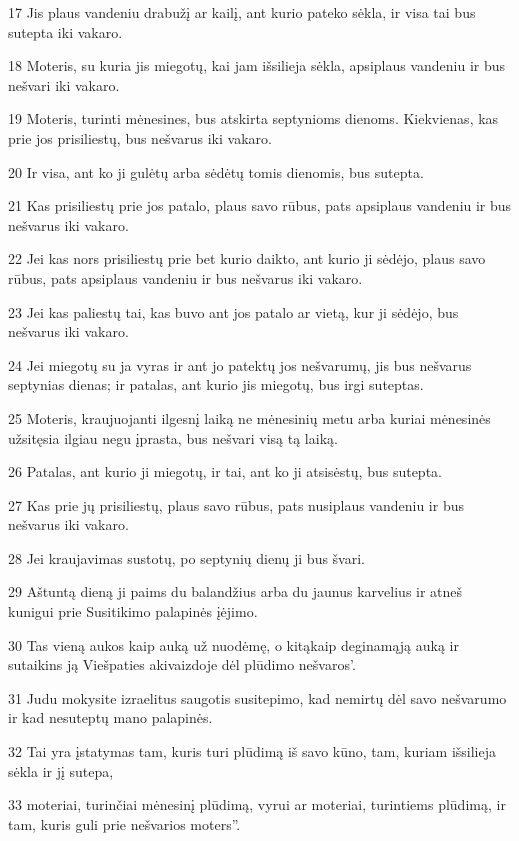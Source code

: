 \par 17 Jis plaus vandeniu drabužį ar kailį, ant kurio pateko sėkla, ir visa tai bus sutepta iki vakaro. 
\par 18 Moteris, su kuria jis miegotų, kai jam išsilieja sėkla, apsiplaus vandeniu ir bus nešvari iki vakaro. 
\par 19 Moteris, turinti mėnesines, bus atskirta septynioms dienoms. Kiekvienas, kas prie jos prisiliestų, bus nešvarus iki vakaro. 
\par 20 Ir visa, ant ko ji gulėtų arba sėdėtų tomis dienomis, bus sutepta. 
\par 21 Kas prisiliestų prie jos patalo, plaus savo rūbus, pats apsiplaus vandeniu ir bus nešvarus iki vakaro. 
\par 22 Jei kas nors prisiliestų prie bet kurio daikto, ant kurio ji sėdėjo, plaus savo rūbus, pats apsiplaus vandeniu ir bus nešvarus iki vakaro. 
\par 23 Jei kas paliestų tai, kas buvo ant jos patalo ar vietą, kur ji sėdėjo, bus nešvarus iki vakaro. 
\par 24 Jei miegotų su ja vyras ir ant jo patektų jos nešvarumų, jis bus nešvarus septynias dienas; ir patalas, ant kurio jis miegotų, bus irgi suteptas. 
\par 25 Moteris, kraujuojanti ilgesnį laiką ne mėnesinių metu arba kuriai mėnesinės užsitęsia ilgiau negu įprasta, bus nešvari visą tą laiką. 
\par 26 Patalas, ant kurio ji miegotų, ir tai, ant ko ji atsisėstų, bus sutepta. 
\par 27 Kas prie jų prisiliestų, plaus savo rūbus, pats nusiplaus vandeniu ir bus nešvarus iki vakaro. 
\par 28 Jei kraujavimas sustotų, po septynių dienų ji bus švari. 
\par 29 Aštuntą dieną ji paims du balandžius arba du jaunus karvelius ir atneš kunigui prie Susitikimo palapinės įėjimo. 
\par 30 Tas vieną aukos kaip auką už nuodėmę, o kitą­kaip deginamąją auką ir sutaikins ją Viešpaties akivaizdoje dėl plūdimo nešvaros’. 
\par 31 Judu mokysite izraelitus saugotis susitepimo, kad nemirtų dėl savo nešvarumo ir kad nesuteptų mano palapinės. 
\par 32 Tai yra įstatymas tam, kuris turi plūdimą iš savo kūno, tam, kuriam išsilieja sėkla ir jį sutepa, 
\par 33 moteriai, turinčiai mėnesinį plūdimą, vyrui ar moteriai, turintiems plūdimą, ir tam, kuris guli prie nešvarios moters”.



